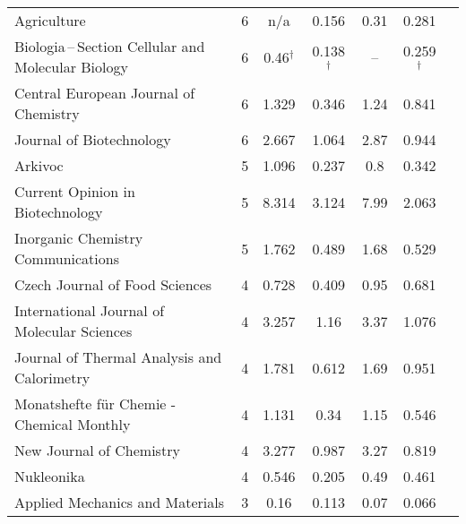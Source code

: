 {\begin{longtable}[c]{lcccccc}
  Agriculture                                                                        & 6      & n/a     & 0.156 &  0.31      & 0.281                 \\[1ex]
  Biologia\,--\,Section Cellular and Molecular Biology                               & 6      & 0.46$^\dagger$    & 0.138 $^\dagger$ &  --       & 0.259$^\dagger$ \\
  Central European Journal of Chemistry                                             & 6      & 1.329   & 0.346 &  1.24      & 0.841                 \\
  Journal of Biotechnology                                                           & 6      & 2.667   & 1.064 &  2.87      & 0.944                 \\
  Arkivoc                                                                            & 5      & 1.096   & 0.237 &  0.8       & 0.342                 \\
  Current Opinion in Biotechnology                                                   & 5      & 8.314   & 3.124 &  7.99      & 2.063                 \\[1ex]
  Inorganic Chemistry Communications                                                 & 5      & 1.762   & 0.489 &  1.68      & 0.529                 \\
  Czech Journal of Food Sciences                                                     & 4      & 0.728   & 0.409 &  0.95      & 0.681                 \\
  International Journal of Molecular Sciences                                        & 4      & 3.257   & 1.16  &  3.37      & 1.076                 \\
  Journal of Thermal Analysis and Calorimetry                                        & 4      & 1.781   & 0.612 &  1.69      & 0.951                 \\
  Monatshefte für Chemie - Chemical Monthly                                          & 4      & 1.131   & 0.34  &  1.15      & 0.546                 \\[1ex]
  New Journal of Chemistry                                                           & 4      & 3.277   & 0.987 &  3.27      & 0.819                 \\
  Nukleonika                                                                         & 4      & 0.546   & 0.205 &  0.49      & 0.461                 \\
  Applied Mechanics and Materials                                                    & 3      & 0.16    & 0.113 &  0.07      & 0.066                 \\

\end{longtable}}
